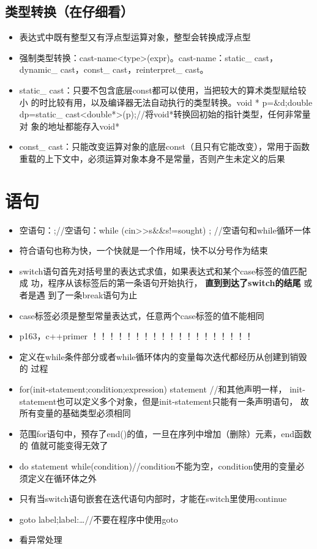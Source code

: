 \documentclass[11pt]{article}
\begin{document}
\subsection{类型转换（在仔细看）}
\label{sec-2-3}
\begin{itemize}
\item 表达式中既有整型又有浮点型运算对象，整型会转换成浮点型
\item 强制类型转换：cast-name<type>(expr)。cast-name：static\_ cast，dynamic\_
cast，const\_ cast，reinterpret\_ cast。
\item static\_ cast：只要不包含底层const都可以使用，当把较大的算术类型赋给较小
的时比较有用，以及编译器无法自动执行的类型转换。void * p=\&d;double
dp=static\_ cast<double*>(p);//将void*转换回初始的指针类型，任何非常量对
象的地址都能存入void*
\item const\_ cast：只能改变运算对象的底层const（且只有它能改变），常用于函数
重载的上下文中，必须运算对象本身不是常量，否则产生未定义的后果
\end{itemize}

\section{语句}
\label{sec-3}
\begin{itemize}
\item 空语句：;//空语句：while (cin>>s\&\&s!=sought) ; //空语句和while循环一体
\item 符合语句也称为快，一个快就是一个作用域，快不以分号作为结束
\item switch语句首先对括号里的表达式求值，如果表达式和某个case标签的值匹配成
功，程序从该标签后的第一条语句开始执行， \textbf{直到到达了switch的结尾} 或者是遇
到了一条break语句为止
\item case标签必须是整型常量表达式，任意两个case标签的值不能相同
\item p163，c++primer ！！！！！！！！！！！！！！！！！！！
\item 定义在while条件部分或者while循环体内的变量每次迭代都经历从创建到销毁的
过程
\item for(init-statement;condition;expression) statement //和其他声明一样，
init-statement也可以定义多个对象，但是init-statement只能有一条声明语句，
故所有变量的基础类型必须相同
\item 范围for语句中，预存了end()的值，一旦在序列中增加（删除）元素，end函数的
值就可能变得无效了
\item do statement while(condition)//condition不能为空，condition使用的变量必
须定义在循环体之外
\item 只有当switch语句嵌套在迭代语句内部时，才能在switch里使用continue
\item goto label;label:\ldots{}//不要在程序中使用goto
\item 看异常处理
\end{itemize}
\end{document}
